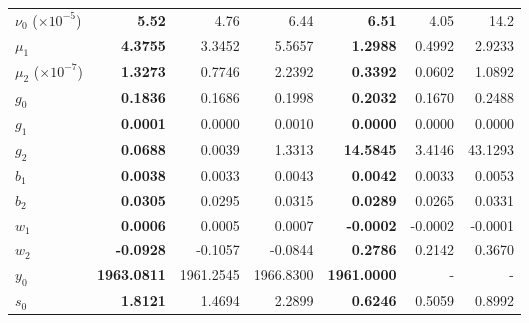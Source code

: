 \begin{table}
\begin{adjustwidth}{-1.5in}{0in}
\begin{tabular}[t]{l>{\bfseries\leavevmode\color{black}}rrr>{\bfseries\leavevmode\color{black}}rrr}
\midrule
$\nu_0$ ($\times 10^{-5}$) & 5.52 & 4.76 & 6.44 & 6.51 & 4.05 & 14.2 \\
$\mu_1$ & 4.3755 & 3.3452 & 5.5657 & 1.2988 & 0.4992 & 2.9233\\
$\mu_2$ ($\times 10^{-7}$) & 1.3273 & 0.7746 & 2.2392 & 0.3392 & 0.0602 & 1.0892\\
$g_0$ & 0.1836 & 0.1686 & 0.1998 & 0.2032 & 0.1670 & 0.2488\\
$g_1$ & 0.0001 & 0.0000 & 0.0010 & 0.0000 & 0.0000 & 0.0000\\
$g_2$ & 0.0688 & 0.0039 & 1.3313 & 14.5845 & 3.4146 & 43.1293\\
\addlinespace
$b_1$ & 0.0038 & 0.0033 & 0.0043 & 0.0042 & 0.0033 & 0.0053\\
$b_2$ & 0.0305 & 0.0295 & 0.0315 & 0.0289 & 0.0265 & 0.0331\\
$w_1$ & 0.0006 & 0.0005 & 0.0007 & -0.0002 & -0.0002 & -0.0001\\
$w_2$ & -0.0928 & -0.1057 & -0.0844 & 0.2786 & 0.2142 & 0.3670\\
$y_0$ & 1963.0811 & 1961.2545 & 1966.8300 & 1961.0000 & - & - \\
$s_0$ & 1.8121 & 1.4694 & 2.2899 & 0.6246 & 0.5059 & 0.8992\\
\bottomrule
\end{tabular}
\end{adjustwidth}
\end{table}

